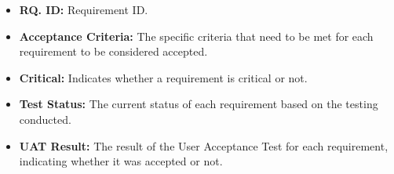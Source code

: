 \begin{justify}
\begin{itemize}
    \item \textbf{RQ. ID:} Requirement ID.
    \item \textbf{Acceptance Criteria:} The specific criteria that need to be met for each requirement to be considered accepted.
    \item \textbf{Critical:} Indicates whether a requirement is critical or not.
    \item \textbf{Test Status:} The current status of each requirement based on the testing conducted.
    \item \textbf{UAT Result:} The result of the User Acceptance Test for each requirement, indicating whether it was accepted or not.\\
\end{itemize}




\end{justify}
